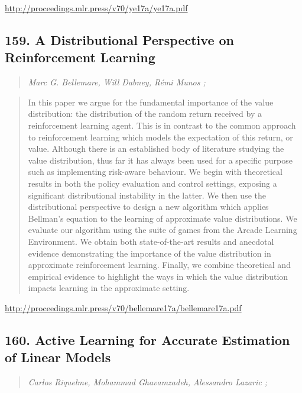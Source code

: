 \documentclass{article}
\begin{document}
\href{http://proceedings.mlr.press/v70/ye17a/ye17a.pdf}{http://proceedings.mlr.press/v70/ye17a/ye17a.pdf}

\subsection{159. A Distributional Perspective on Reinforcement Learning}

\begin{quote}
\footnotesize{\textit{Marc G. Bellemare, Will Dabney, Rémi Munos ;}}

\end{quote}

\begin{quote}
    In this paper we argue for the fundamental importance of the value distribution: the distribution of the random return received by a reinforcement learning agent. This is in contrast to the common approach to reinforcement learning which models the expectation of this return, or value. Although there is an established body of literature studying the value distribution, thus far it has always been used for a specific purpose such as implementing risk-aware behaviour. We begin with theoretical results in both the policy evaluation and control settings, exposing a significant distributional instability in the latter. We then use the distributional perspective to design a new algorithm which applies Bellman’s equation to the learning of approximate value distributions. We evaluate our algorithm using the suite of games from the Arcade Learning Environment. We obtain both state-of-the-art results and anecdotal evidence demonstrating the importance of the value distribution in approximate reinforcement learning. Finally, we combine theoretical and empirical evidence to highlight the ways in which the value distribution impacts learning in the approximate setting.  
\end{quote}

\href{http://proceedings.mlr.press/v70/bellemare17a/bellemare17a.pdf}{http://proceedings.mlr.press/v70/bellemare17a/bellemare17a.pdf}

\subsection{160. Active Learning for Accurate Estimation of Linear Models}

\begin{quote}
\footnotesize{\textit{Carlos Riquelme, Mohammad Ghavamzadeh, Alessandro Lazaric ;}}

\end{quote}
\end{document}

